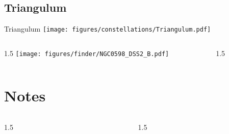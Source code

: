 \documentclass[final]{beamer}
\newlength{\colwidth}
\begin{document}
\subsection{Triangulum}

\begin{frame}[t]{\LARGE Triangulum}
  \centering
  \texttt{[image: figures/constellations/Triangulum.pdf]}
\end{frame}


\begin{frame}[t]{}
  \begin{columns}[T]
    \begin{column}{1.5\colwidth}
      \centering
      \texttt{[image: figures/finder/NGC0598\_DSS2\_B.pdf]}
    \end{column}
    \begin{column}{1.5\colwidth}
      \Large
      
    \end{column}
  \end{columns}
  \vspace{\fill}
\end{frame}

\section{Notes}

\begin{frame}[t]{}
  \begin{columns}[T]
    \begin{column}{1.5\colwidth}
      
    \end{column}
    \begin{column}{1.5\colwidth}
      
    \end{column}
  \end{columns}
  \vspace{\fill}
\end{frame}
\end{document}
